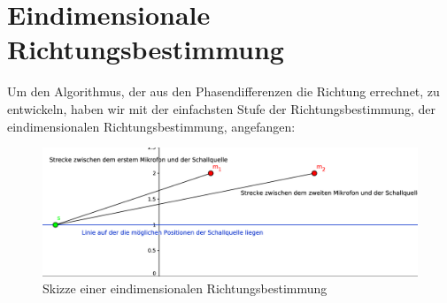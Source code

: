 \section{Eindimensionale Richtungsbestimmung}
Um den Algorithmus, der aus den Phasendifferenzen die Richtung errechnet, zu entwickeln, haben wir mit der
einfachsten Stufe der Richtungsbestimmung, der eindimensionalen Richtungsbestimmung, angefangen:
\begin{figure}[H]
  \centering
  \includegraphics[width=\linewidth]{img/skizze}
  \caption{Skizze einer eindimensionalen Richtungsbestimmung}
\label{fig:skizz1d}
\end{figure}

